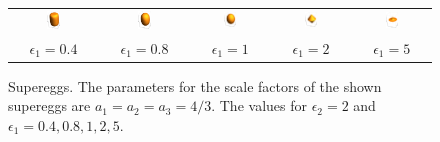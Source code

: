 \begin{figure}[htb]
\begin{tabular}{ccccc}
     \includegraphics[width=0.18\textwidth]{../images/form_factor/supershapes/SuperEggPietHein.png}
    & \includegraphics[width=0.18\textwidth]{../images/form_factor/supershapes/SuperEgg08.png}
    & \includegraphics[width=0.18\textwidth]{../images/form_factor/supershapes/SuperEgg1.png}
    & \includegraphics[width=0.18\textwidth]{../images/form_factor/supershapes/SuperEgg2.png}
    & \includegraphics[width=0.18\textwidth]{../images/form_factor/supershapes/SuperEgg5.png} \\
     $\epsilon_1=0.4$ & $\epsilon_1=0.8$ & $\epsilon_1=1$ & $\epsilon_1=2$ & $\epsilon_1=5$
\end{tabular}
\caption{Supereggs. The parameters for the scale factors of the shown supereggs are $a_1 = a_2 = a_3 = 4/3$. The values for $\epsilon_2=2$ and $\epsilon_1=0.4, 0.8, 1,2,5$.}
\label{fig:opo_superegg}
\end{figure}

